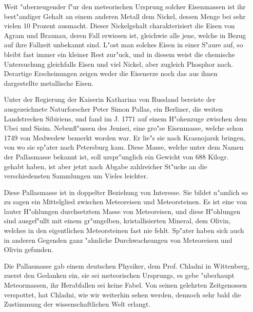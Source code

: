 \documentclass[a4paper, 11pt, oneside]{article}
\begin{document}
Weit "uberzeugender f"ur den meteorischen Ursprung solcher Eisenmassen ist ihr best"andiger Gehalt an einem anderen Metall dem Nickel, dessen Menge bei sehr vielen 10 Prozent ausmacht. Dieser Nickelgehalt charakterisiert die Eisen von Agram und Braunau, deren Fall erwiesen ist, gleichwie alle jene, welche in Bezug auf ihre Fallzeit unbekannt sind. L"ost man solches Eisen in einer S"aure auf, so bleibt fast immer ein kleiner Rest zur"uck, und in diesem weist die chemische Untersuchung gleichfalls Eisen und viel Nickel, aber zugleich Phosphor nach. Derartige Erscheinungen zeigen weder die Eisenerze noch das aus ihnen dargestellte metallische Eisen.

Unter der Regierung der Kaiserin Katharina von Russland bereiste der ausgezeichnete Naturforscher Peter Simon Pallas, ein Berliner, die weiten Landstrecken Sibiriens, und fand im J. 1771 auf einem H"ohenzuge zwischen dem Ubei und Sisim. Nebenfl"ussen des Jenisei, eine gro"se Eisenmasse, welche schon 1749 von Medwedew bemerkt worden war. Er lie"s sie nach Krasnojarsk bringen, von wo sie sp"ater nach Petersburg kam. Diese Masse, welche unter dem Namen der Pallasmasse bekannt ist, soll urspr"unglich ein Gewicht von 688 Kilogr. gehabt haben, ist aber jetzt nach Abgabe zahlreicher St"ucke an die verschiedensten Sammlungen um Vieles leichter.

Diese Pallasmasse ist in doppelter Beziehung von Interesse. Sie bildet n"amlich so zu sagen ein Mittelglied zwischen Meteoreisen und Meteorsteinen. Es ist eine von lauter H"ohlungen durchsetztem Masse von Meteoreisen, und diese H"ohlungen sind ausgef"ullt mit einem gr"ungelben, kristallisierten Mineral, dem Olivin, welches in den eigentlichen Meteorsteinen fast nie fehlt. Sp"ater haben sich auch in anderen Gegenden ganz "ahnliche Durchwachsungen von Meteoreisen und Olivin gefunden.

Die Pallasmasse gab einem deutschen Physiker, dem Prof. Chladni in Wittenberg, zuerst den Gedanken ein, sie sei meteorischen Ursprungs, es gebe "uberhaupt Meteormassen, ihr Herabfallen sei keine Fabel. Von seinen gelehrten Zeitgenossen verspottet, hat Chladni, wie wir weiterhin sehen werden, dennoch sehr bald die Zustimmung der wissenschaftlichen Welt erlangt.
\end{document}
